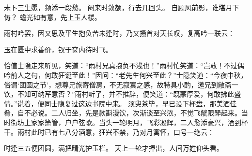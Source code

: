 \documentclass[12pt,oneside]{book}
\begin{document}
未卜三生愿，频添一段愁。
闷来时敛额，行去几回头。
自顾风前影，谁堪月下俦？
蟾光如有意，先上玉人楼。

雨村吟罢，因又思及平生抱负苦未逢时，乃又搔首对天长叹，复高吟一联云：

玉在匮中求善价，钗于奁内待时飞。

恰值士隐走来听见，笑道：“雨村兄真抱负不浅也！”雨村忙笑道：“岂敢！不过偶吟前人之句，何敢狂诞至此！”因问：“老先生何兴至此？”士隐笑道：“今夜中秋，俗谓‘团圆之节’，想尊兄旅寄僧房，不无寂寞之感，故特具小酌，邀兄到敝斋一饮，不知可纳芹意否？”雨村听了，并不推辞，便笑道：“既蒙厚爱，何敢拂此盛情。”说着，便同士隐复过这边书院中来。
须臾茶毕，早已设下杯盘，那美酒佳肴，自不必说。二人归坐，先是款斟漫饮，次渐谈至兴浓，不觉飞觥限斝起来。当时街坊上家家箫管，户户弦歌。当头一轮明月，飞彩凝辉，二人愈添豪兴，酒到杯干。雨村此时已有七八分酒意，狂兴不禁，乃对月寓怀，口号一绝云：

时逢三五便团圆，满把晴光护玉栏。
天上一轮才捧出，人间万姓仰头看。
\end{document}

